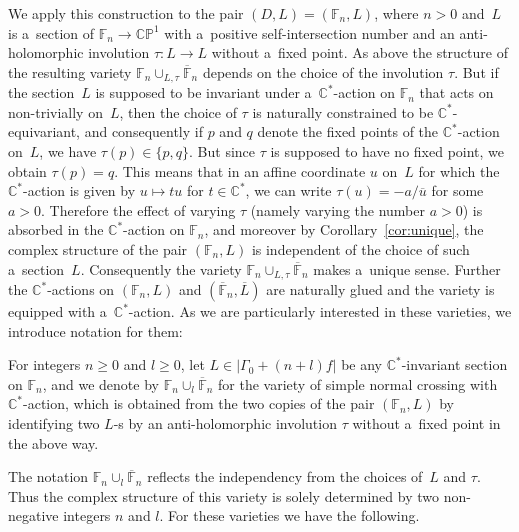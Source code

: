 \documentclass[pdftex]{sigma}
\numberwithin{equation}{section}
\begin{document}
We apply this construction to the pair $(D,L) = (\mathbb{F}_n,L)$, where $n > 0$ and~$L$ is a~section of
$\mathbb{F}_n\to \mathbb{CP}^1$ with a~positive self-intersection number and an anti-holomorphic involution $\tau:L\to L$ without a~f\/ixed point.
As above the structure of the resulting variety $\mathbb{F}_n\cup_{L,\tau}\overline{\mathbb{F}}_n$ depends on the choice
of the involution $\tau$.
But if the section~$L$ is supposed to be invariant under a~$\mathbb{C}^*$-action on $\mathbb{F}_n$ that acts on
non-trivially on~$L$, then the choice of $\tau$ is naturally constrained to be $\mathbb{C}^*$-equivariant, and
consequently if $p$ and $q$ denote the f\/ixed points of the $\mathbb{C}^*$-action on~$L$, we have $\tau(p)\in\{p,q\}$.
But since $\tau$ is supposed to have no f\/ixed point, we obtain $\tau(p) = q$.
This means that in an af\/f\/ine coordinate $u$ on~$L$ for which the $\mathbb{C}^*$-action is given by $u\mapsto tu$ for
$t\in\mathbb{C}^*$, we can write $\tau(u) = -a/\overline u$ for some $a>0$.
Therefore the ef\/fect of varying $\tau$ (namely varying the number $a>0$) is absorbed in the $\mathbb{C}^*$-action on
$\mathbb{F}_n$, and moreover by Corollary~\ref{cor:unique}, the complex structure of the pair $(\mathbb{F}_n,L)$ is
independent of the choice of such a~section~$L$.
Consequently the variety $\mathbb{F}_n\cup_{L,\tau}\overline{\mathbb{F}}_n$ makes a~unique sense.
Further the $\mathbb{C}^*$-actions on $(\mathbb{F}_n,L)$ and $(\overline{\mathbb{F}}_n,\overline L)$ are naturally glued
and the variety is equipped with a~$\mathbb{C}^*$-action.
As we are particularly interested in these varieties, we introduce notation for them:

\begin{Definition}
\label{def:scn}
For integers $n \ge 0$ and $l\ge 0$, let $L\in |\Gamma_0 + (n+l)f|$ be any $\mathbb{C}^*$-invariant section on
$\mathbb{F}_n$, and we denote by $\mathbb{F}_n\cup_l\overline{\mathbb{F}}_n$ for the variety of simple normal crossing
with $\mathbb{C}^*$-action, which is obtained from the two copies of the pair $(\mathbb{F}_n,L)$ by identifying two
$L$-s by an anti-holomorphic involution $\tau$ without a~f\/ixed point in the above way.
\end{Definition}

The notation $\mathbb{F}_n\cup_l\overline{\mathbb{F}}_n$ ref\/lects the independency from the choices of~$L$ and $\tau$.
Thus the complex structure of this variety is solely determined by two non-negative integers $n$ and $l$.
For these varieties we have the following.
\end{document}
